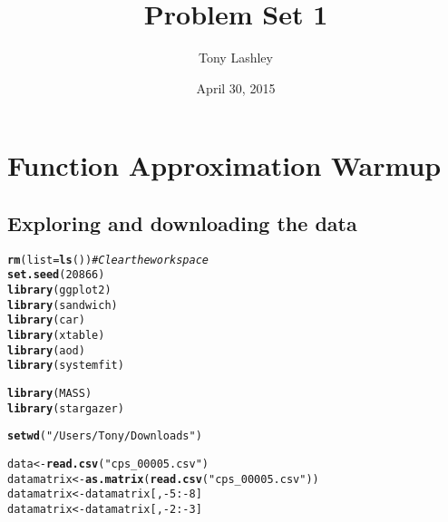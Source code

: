 \documentclass{article}\usepackage[]{graphicx}\usepackage[]{color}
\title{Problem Set 1}
\author{Tony Lashley}
\date{April 30, 2015}
\makeatletter
\newcommand{\hlnum}[1]{\textcolor[rgb]{0.686,0.059,0.569}{#1}}%
\newcommand{\hlstr}[1]{\textcolor[rgb]{0.192,0.494,0.8}{#1}}%
\newcommand{\hlcom}[1]{\textcolor[rgb]{0.678,0.584,0.686}{\textit{#1}}}%
\newcommand{\hlopt}[1]{\textcolor[rgb]{0,0,0}{#1}}%
\newcommand{\hlstd}[1]{\textcolor[rgb]{0.345,0.345,0.345}{#1}}%
\newcommand{\hlkwb}[1]{\textcolor[rgb]{0.69,0.353,0.396}{#1}}%
\newcommand{\hlkwc}[1]{\textcolor[rgb]{0.333,0.667,0.333}{#1}}%
\newcommand{\hlkwd}[1]{\textcolor[rgb]{0.737,0.353,0.396}{\textbf{#1}}}%
\newenvironment{kframe}{%
 \def\at@end@of@kframe{}%
 \ifinner\ifhmode%
  \def\at@end@of@kframe{\end{minipage}}%
  \begin{minipage}{\columnwidth}%
 \fi\fi%
 \def\FrameCommand##1{\hskip\@totalleftmargin \hskip-\fboxsep
 \colorbox{shadecolor}{##1}\hskip-\fboxsep
     \hskip-\linewidth \hskip-\@totalleftmargin \hskip\columnwidth}%
 \MakeFramed {\advance\hsize-\width
   \@totalleftmargin\z@ \linewidth\hsize
   \@setminipage}}%
 {\par\unskip\endMakeFramed%
 \at@end@of@kframe}
\newenvironment{knitrout}{}{} %
\makeatother
\begin{document}
\section{Function Approximation Warmup}
\subsection{Exploring and downloading the data}

\begin{knitrout}
\color{fgcolor}\begin{kframe}
\begin{alltt}
\hlkwd{rm}\hlstd{(}\hlkwc{list}\hlstd{=}\hlkwd{ls}\hlstd{())}           \hlcom{# Clear the workspace}
\hlkwd{set.seed}\hlstd{(}\hlnum{20866}\hlstd{)}
\hlkwd{library}\hlstd{(ggplot2)}
\hlkwd{library}\hlstd{(sandwich)}
\hlkwd{library}\hlstd{(car)}
\hlkwd{library}\hlstd{(xtable)}
\hlkwd{library}\hlstd{(aod)}
\hlkwd{library}\hlstd{(systemfit)}
\end{alltt}


{\ttfamily\noindent\itshape\color{messagecolor}{\#\# Loading required package: Matrix\\\#\# Loading required package: lmtest\\\#\# Loading required package: zoo\\\#\# \\\#\# Attaching package: 'zoo'\\\#\# \\\#\# The following objects are masked from 'package:base':\\\#\# \\\#\#\ \ \ \  as.Date, as.Date.numeric}}\begin{alltt}
\hlkwd{library}\hlstd{(MASS)}
\hlkwd{library}\hlstd{(stargazer)}
\end{alltt}


{\ttfamily\noindent\itshape\color{messagecolor}{\#\# \\\#\# Please cite as: \\\#\# \\\#\#\ \ Hlavac, Marek (2014). stargazer: LaTeX code and ASCII text for well-formatted regression and summary statistics tables.\\\#\#\ \ R package version 5.1. http://CRAN.R-project.org/package=stargazer}}\begin{alltt}
\hlkwd{setwd}\hlstd{(}\hlstr{"/Users/Tony/Downloads"}\hlstd{)}

\hlstd{data} \hlkwb{<-} \hlkwd{read.csv}\hlstd{(}\hlstr{"cps_00005.csv"}\hlstd{)}
\hlstd{datamatrix} \hlkwb{<-} \hlkwd{as.matrix}\hlstd{(}\hlkwd{read.csv}\hlstd{(}\hlstr{"cps_00005.csv"}\hlstd{))}
\hlstd{datamatrix} \hlkwb{<-} \hlstd{datamatrix[,}\hlopt{-}\hlnum{5}\hlopt{:-}\hlnum{8}\hlstd{]}
\hlstd{datamatrix} \hlkwb{<-} \hlstd{datamatrix[,}\hlopt{-}\hlnum{2}\hlopt{:-}\hlnum{3}\hlstd{]}


\end{alltt}
\end{kframe}
\end{knitrout}
\end{document}
